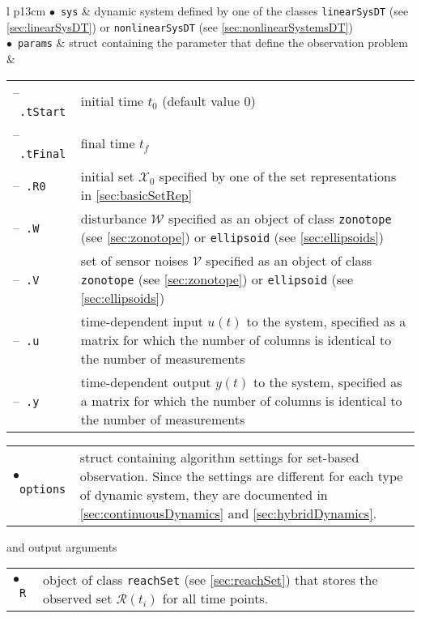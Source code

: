 \begin{center}
\renewcommand{\arraystretch}{1.3}
\begin{tabular}[t]{l p{13cm} }
	$\bullet$~\texttt{sys} & dynamic system defined by one of the classes \texttt{linearSysDT} (see \cref{sec:linearSysDT}) or \texttt{nonlinearSysDT} (see \cref{sec:nonlinearSystemsDT}) \\
	$\bullet$~\texttt{params} & struct containing the parameter that define the observation problem \\
	& \begin{tabular}[t]{l p{10cm}}	
	 	--~\texttt{.tStart} & initial time $t_0$ (default value 0) \\
	 	--~\texttt{.tFinal} & final time $t_f$ \\
	 	--~\texttt{.R0} & initial set $\mathcal{X}_0$ specified by one of the set representations in \cref{sec:basicSetRep}\\
	 	--~\texttt{.W} & disturbance $\mathcal{W}$ specified as an object of class \texttt{zonotope} (see \cref{sec:zonotope}) or \texttt{ellipsoid} (see \cref{sec:ellipsoids}) \\
	 	--~\texttt{.V} & set of sensor noises $\mathcal{V}$ specified as an object of class \texttt{zonotope} (see \cref{sec:zonotope}) or \texttt{ellipsoid} (see \cref{sec:ellipsoids}) \\
	 	--~\texttt{.u} & time-dependent input $u(t)$ to the system, specified as a matrix for which the number of columns is identical to the number of measurements \\
	 	--~\texttt{.y} & time-dependent output $y(t)$ to the system, specified as a matrix for which the number of columns is identical to the number of measurements 
	 \end{tabular}
\end{tabular}
\end{center}
\begin{center}
\renewcommand{\arraystretch}{1.3}
\begin{tabular}[t]{l p{13cm} }
	$\bullet$~\texttt{options} & struct containing algorithm settings for set-based observation. Since the settings are different for each type of dynamic system, they are documented in \cref{sec:continuousDynamics} and \cref{sec:hybridDynamics}.
\end{tabular}
\end{center}

and output arguments

\begin{center}
\renewcommand{\arraystretch}{1.3}
\begin{tabular}[t]{l p{13cm} }
	$\bullet$~\texttt{R} & object of class \texttt{reachSet} (see \cref{sec:reachSet}) that stores the observed set $\mathcal{R}(t_i)$ for all time points.
\end{tabular}
\end{center}


